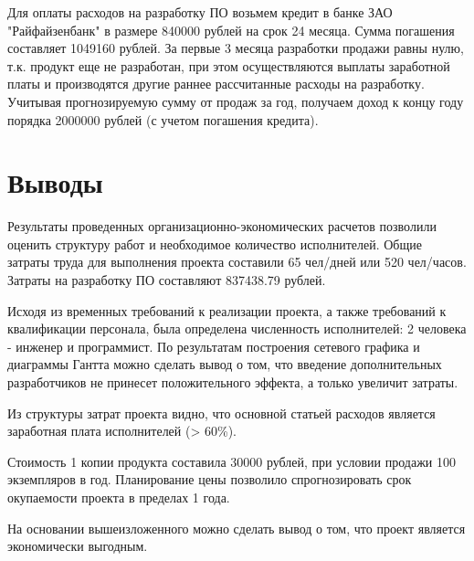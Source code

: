 Для оплаты расходов на разработку ПО возьмем кредит в банке ЗАО "Райфайзенбанк" в размере 840000 рублей на срок 24 месяца. Сумма погашения составляет 1049160 рублей. За первые 3 месяца разработки продажи равны нулю, т.к. продукт еще не разработан, при этом осуществляются выплаты заработной платы и производятся другие раннее рассчитанные расходы на разработку. Учитывая прогнозируемую сумму от продаж за год, получаем доход к концу году порядка 2000000 рублей (с учетом погашения кредита).

\section{Выводы}
Результаты проведенных организационно-экономических расчетов позволили оценить структуру работ и необходимое количество исполнителей. Общие затраты труда для выполнения проекта составили 65 чел/дней или 520 чел/часов. Затраты на разработку ПО составляют 837438.79 рублей.

Исходя из временных требований к реализации проекта, а также требований к квалификации персонала, была определена численность исполнителей: 2 человека - инженер и программист. По результатам построения сетевого графика и диаграммы Гантта можно сделать вывод о том, что введение дополнительных разработчиков не принесет положительного эффекта, а только увеличит затраты.

Из структуры затрат проекта видно, что основной статьей расходов является заработная плата исполнителей (> 60\%).

Стоимость 1 копии продукта составила 30000 рублей, при условии продажи 100 экземпляров в год. Планирование цены позволило спрогнозировать срок окупаемости проекта в пределах 1 года.

На основании вышеизложенного можно сделать вывод о том, что проект является экономически выгодным.
